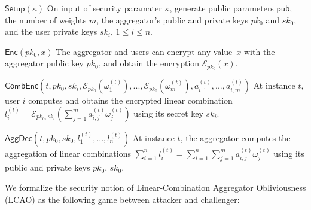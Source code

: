 \documentclass[10pt,letterpaper,oneside,twocolumn,journal]{IEEEtran}
\theoremstyle{definition}
\theoremstyle{definition}
\theoremstyle{remark}
\newcommand\shrtdots{\!...}
\begin{document}
\begin{LaTeXdescription}
    \item[$\mathsf{Setup}(\kappa)$] On input of security paramater $\kappa$, generate public parameters $\mathsf{pub}$, the number of weights $m$, the aggregator's public and private keys $pk_0$ and $sk_0$, and the user private keys $sk_i,\,1\leq i \leq n$.
    \item[$\mathsf{Enc}(pk_0, x)$] The aggregator and users can encrypt any value~$x$ with the aggregator public key $pk_0$, and obtain the encryption $\mathcal{E}_{pk_0}(x)$.
    \item[$\mathsf{CombEnc}(t, pk_0, sk_i, \mathcal{E}_{pk_0}(\omega_1^{(t)}),\shrtdots,\mathcal{E}_{pk_0}(\omega_m^{(t)}), a^{(t)}_{i,1},\shrtdots,a^{(t)}_{i,m})$] At instance $t$, user $i$ computes and obtains the encrypted linear combination $l^{(t)}_i = \mathcal{E}_{pk_0,sk_i}(\sum^m_{j=1}a^{(t)}_{i,j}\omega^{(t)}_j)$ using its secret key $sk_i$.
    \item[$\mathsf{AggDec}(t, pk_0, sk_0, l^{(t)}_1,\shrtdots,l^{(t)}_n)$] At instance $t$, the aggregator computes the aggregation of linear combinations $\sum^{n}_{i=1}l_i^{(t)}=\sum^{n}_{i=1}\sum^{m}_{j=1} a^{(t)}_{i,j}\omega^{(t)}_j$ using its public and private keys $pk_0$, $sk_0$.
\end{LaTeXdescription}

We formalize the security notion of Linear-Combination Aggregator Obliviousness (LCAO) as the following game between attacker and challenger:
\end{document}

